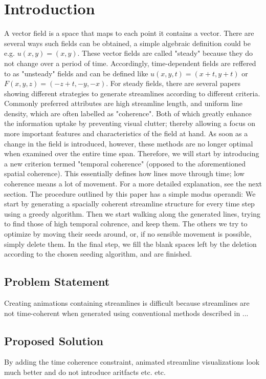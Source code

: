 
\chapter{Introduction}

A vector field is a space that maps to each point it contains a vector.
There are several ways such fields can be obtained, a simple algebraic definition could be e.g. $u(x,y) = (x,y)$.
These vector fields are called "steady" because they do not change over a period of time.
Accordingly, time-dependent fields are reffered to as "unsteady" fields and can be defined like $u(x,y,t) = (x+t,y+t)$ or $F(x,y,z) = (-z+t, -y ,-x)$.
For steady fields, there are several papers showing different strategies to generate streamlines according to different criteria.
Commonly preferred attributes are high streamline length, and uniform line density, which are often labelled as "coherence".
Both of which greatly enhance the information uptake by preventing visual clutter;
thereby allowing a focus on more important features and characteristics of the field at hand.
As soon as a change in the field is introduced, however, these methods are no longer optimal when examined over the entire time span.
Therefore, we will start by introducing a new criterion termed "temporal coherence" (opposed to the aforementioned spatial coherence).
This essentially defines how lines move through time; low coherence means a lot of movement. For a more detailed explanation, see the next section.
The procedure outlined by this paper has a simple modus operandi:
We start by generating a spacially coherent streamline structure for every time step using a greedy algorithm.
Then we start walking along the generated lines, trying to find those of high temporal cohrence, and keep them.
The others we try to optimize by moving their seeds around, or, if no sensible movement is possible, simply delete them.
In the final step, we fill the blank spaces left by the deletion according to the chosen seeding algorithm, and are finished.

\section{Problem Statement}
Creating animations containing streamlines is difficult because streamlines are not time-coherent when generated using conventional methods described in ...

\section{Proposed Solution}
By adding the time coherence constraint, animated streamline visualizations look much better and do not introduce aritfacts etc. etc.




